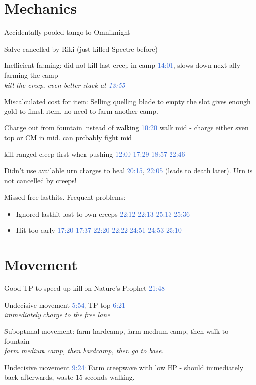 \documentclass{article}
\newcommand{\gt}{\ensuremath{\;\;\color{green} \filledmedtriangleup} }
\newcommand{\rt}{\ensuremath{\;\;\color{red} \filledmedtriangledown} }
\newcommand{\ws}{\ensuremath{\;\;\color{white} \filledmedsquare} }
\newenvironment{remarks}
    {
        \begin{description}
            \setlength\itemsep{0em}
    }
    {
        \end{description}
    }
\newcommand{\goodremark}[1]{\item[\gt] #1}
\newcommand{\neutralremark}[1]{\item[\ws] #1}
\newcommand{\badremark}[1]{\item[\rt] #1}
\newcommand{\logremark}[2]{\item[\textnormal{\logref{#1}}] #2}
\newcommand{\suggestion}[1]{\\ \emph{#1}}
\newcommand{\logref}[1]{\textcolor{highlight}{#1}}
\begin{document}
\section{Mechanics}
\begin{remarks}

    \logremark{-0:32}{ Accidentally pooled tango to Omniknight}
    \logremark{5:37}{ Salve cancelled by Riki (just killed Spectre before)}

\neutralremark{Inefficient farming:
    did not kill last creep in camp \logref{14:01}, slows down next ally farming the camp
    \suggestion{kill the creep, even better stack at \logref{13:55}} }

\neutralremark{Miscalculated cost for item: 
    Selling quelling blade to empty the slot gives enough gold to finish item, no need to farm another camp.}

\neutralremark{Charge out from fountain instead of walking 
    \logref{10:20} walk mid - charge either sven top or CM in mid. can probably fight mid}

\neutralremark{ kill ranged creep first when pushing \logref{12:00} \logref{17:29} \logref{18:57} \logref{22:46}}

\badremark{Didn't use available urn charges to heal \logref{20:15}, \logref{22:05} (leads to death later). Urn is not cancelled by creeps!}

\badremark{Missed free lasthits. Frequent problems:
\begin{itemize}
    \item Ignored lasthit lost to own creeps \logref{22:12} \logref{22:13} \logref{25:13} \logref{25:36}
    \item Hit too early \logref{17:20} \logref{17:37} \logref{22:20} \logref{22:22} \logref{24:51} \logref{24:53} \logref{25:10}
\end{itemize}
}

\end{remarks}

\section{Movement}
\begin{remarks}

\goodremark{Good TP to speed up kill on Nature's Prophet \logref{21:48}}

\neutralremark{Undecisive movement \logref{5:54}, TP top  \logref{6:21}
    \suggestion{immediately charge to the free lane}}

\neutralremark{Suboptimal movement: farm hardcamp, farm medium camp, then walk to fountain
    \suggestion{farm medium camp, then hardcamp, then go to base.}}

\badremark{Undecisive movement \logref{9:24}: Farm creepwave with low HP - should immediately back afterwards, waste 15 seconds walking.}
\end{remarks}
\end{document}
